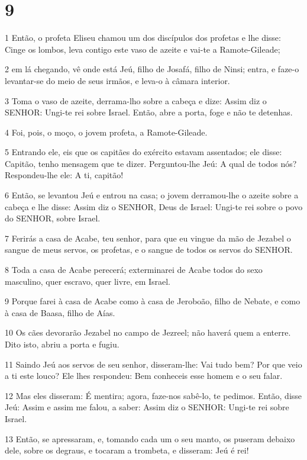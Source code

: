 \chapter{9}

\par 1 Então, o profeta Eliseu chamou um dos discípulos dos profetas e lhe disse: Cinge os lombos, leva contigo este vaso de azeite e vai-te a Ramote-Gileade;
\par 2 em lá chegando, vê onde está Jeú, filho de Josafá, filho de Ninsi; entra, e faze-o levantar-se do meio de seus irmãos, e leva-o à câmara interior.
\par 3 Toma o vaso de azeite, derrama-lho sobre a cabeça e dize: Assim diz o SENHOR: Ungi-te rei sobre Israel. Então, abre a porta, foge e não te detenhas.
\par 4 Foi, pois, o moço, o jovem profeta, a Ramote-Gileade.
\par 5 Entrando ele, eis que os capitães do exército estavam assentados; ele disse: Capitão, tenho mensagem que te dizer. Perguntou-lhe Jeú: A qual de todos nós? Respondeu-lhe ele: A ti, capitão!
\par 6 Então, se levantou Jeú e entrou na casa; o jovem derramou-lhe o azeite sobre a cabeça e lhe disse: Assim diz o SENHOR, Deus de Israel: Ungi-te rei sobre o povo do SENHOR, sobre Israel.
\par 7 Ferirás a casa de Acabe, teu senhor, para que eu vingue da mão de Jezabel o sangue de meus servos, os profetas, e o sangue de todos os servos do SENHOR.
\par 8 Toda a casa de Acabe perecerá; exterminarei de Acabe todos do sexo masculino, quer escravo, quer livre, em Israel.
\par 9 Porque farei à casa de Acabe como à casa de Jeroboão, filho de Nebate, e como à casa de Baasa, filho de Aías.
\par 10 Os cães devorarão Jezabel no campo de Jezreel; não haverá quem a enterre. Dito isto, abriu a porta e fugiu.
\par 11 Saindo Jeú aos servos de seu senhor, disseram-lhe: Vai tudo bem? Por que veio a ti este louco? Ele lhes respondeu: Bem conheceis esse homem e o seu falar.
\par 12 Mas eles disseram: É mentira; agora, faze-nos sabê-lo, te pedimos. Então, disse Jeú: Assim e assim me falou, a saber: Assim diz o SENHOR: Ungi-te rei sobre Israel.
\par 13 Então, se apressaram, e, tomando cada um o seu manto, os puseram debaixo dele, sobre os degraus, e tocaram a trombeta, e disseram: Jeú é rei!
